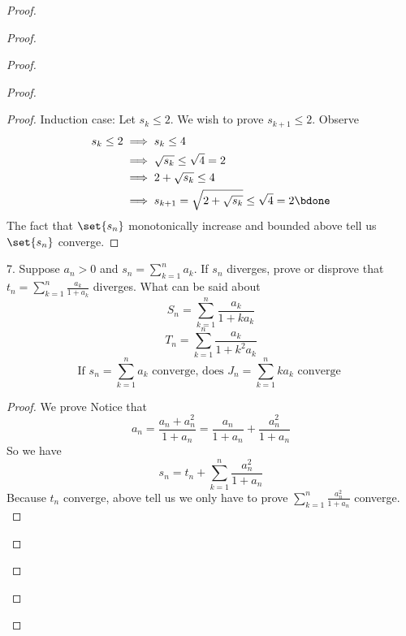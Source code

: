 \documentclass{report}
\begin{document}
\begin{proof}
\begin{proof}
\begin{proof}
\begin{proof}
\begin{proof}
Induction case: Let $s_k\leq 2$. We wish to prove  $s_{k+1}\leq 2$. Observe
\begin{align*}
  s_k\leq 2&\implies s_k\leq 4\\
  &\implies \sqrt{s_k}\leq \sqrt{4} =2\\
  &\implies 2+\sqrt{s_k} \leq 4\\
  &\implies s_{k+1}=\sqrt{2+\sqrt{s_k} }\leq \sqrt{4}=2 \bdone
\end{align*}
The fact that $\set{s_n}$ monotonically increase and bounded above tell us $\set{s_n}$ converge.
\end{proof}
\begin{question}{}{}
7. Suppose $a_n > 0$ and $s_n = \sum _{k=1}^{n} a_k$. If $s_n$ diverges, prove or disprove that $t_n=\sum_{k=1}^{n} \frac{a_k}{1+a_k}$ diverges. What can be said about
\begin{equation*}
S_n=\sum_{k=1}^n \frac{a_k}{1+ka_k}
\end{equation*}
\begin{equation*}
T_n=\sum_{k=1}^n \frac{a_k}{1+k^2a_k}
\end{equation*}
\begin{equation*}
\text{If } s_n=\sum_{k=1}^n a_k\text{ converge, does }J_n=\sum_{k=1}^n ka_k\text{ converge }
\end{equation*}
\end{question}
\begin{proof}
  We prove 
Notice that
\begin{equation*}
a_n=\frac{a_n+a_n^2}{1+a_n}=\frac{a_n}{1+a_n}+\frac{a_n^2}{1+a_n}
\end{equation*}
So we have
\begin{equation*}
s_n=t_n+\sum_{k=1}^n \frac{a_n^2}{1+a_n}
\end{equation*}
Because $t_n$ converge, above tell us we only have to prove  $\sum_{k=1}^n \frac{a_n^2}{1+a_n}$ converge.\\


\end{proof}
\end{proof}
\end{proof}
\end{proof}
\end{proof}
\end{document}
